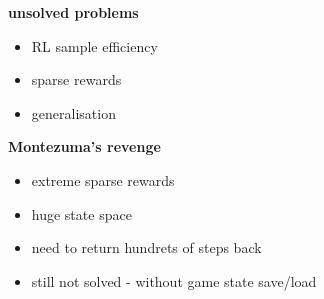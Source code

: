\documentclass{beamer}
\begin{document}
\begin{frame}{\bf unsolved problems}

  \begin{itemize}
    \item RL sample efficiency
    \item sparse rewards
    \item generalisation
  \end{itemize}
  
  \end{frame}
  
  \begin{frame}{\bf Montezuma's revenge}
  
  
    \begin{itemize}
      \item extreme sparse rewards
      \item huge state space
      \item need to return hundrets of steps back
      \item still not solved - without game state save/load
    \end{itemize}
  
  \end{frame}
  
\end{document}
